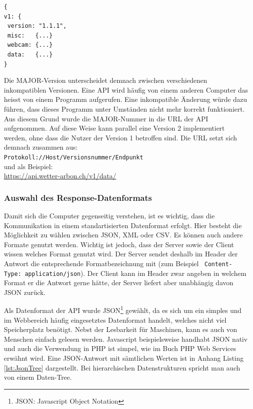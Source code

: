 \vspace{3mm}
\begin{lstlisting}[label=lst:versionierung,caption=Versionierungsangabe auf der obersten Hierarchiestufe, language=HTML5, style=php]
{
v1: {
 version: "1.1.1",
 misc:   {...}
 webcam: {...}
 data:   {...}
}
\end{lstlisting}
\vspace{3mm}

\noindent
Die MAJOR-Version unterscheidet demnach zwischen verschiedenen inkompatiblen Versionen. Eine API wird häufig von einem anderen Computer das heisst von einem Programm aufgerufen. Eine inkompatible Änderung würde dazu führen, dass dieses Programm unter Umständen nicht mehr korrekt funktioniert. Aus diesem Grund wurde die MAJOR-Nummer in die URL der API aufgenommen. Auf diese Weise kann parallel eine Version 2 implementiert werden, ohne dass die Nutzer der Version 1 betroffen sind. Die URL setzt sich demnach zusammen aus: \\

\noindent
\texttt{Protokoll://Host/Versionsnummer/Endpunkt}\\
und als Beispiel:\\
\url{https://api.wetter-arbon.ch/v1/data/}

\noindent
{}


\subsubsection{Auswahl des Response-Datenformats}
Damit sich die Computer gegenseitig verstehen, ist es wichtig, dass die Kommunikation in einem standartisierten Datenformat erfolgt. Hier besteht die Möglichkeit zu wählen zwischen JSON, XML oder CSV. Es können auch andere Formate genutzt werden. Wichtig ist jedoch, dass der Server sowie der Client wissen welches Format genutzt wird. Der Server sendet deshalb im Header der Antwort die entsprechende Formatbezeichnung mit (zum Beispiel \texttt{ Content-Type: application/json}). Der Client kann im Header zwar angeben in welchem Format er die Antwort gerne hätte, der Server liefert aber unabhängig davon JSON zurück.

Als Datenformat der API wurde JSON\footnote{JSON: Javascript Object Notation} gewählt, da es sich um ein simples und im Webbereich häufig eingesetztes Datenformat handelt, welches nicht viel Speicherplatz benötigt. Nebst der Lesbarkeit für Maschinen, kann es auch von Menschen einfach gelesen werden. Javascript beispielsweise handhabt JSON nativ und auch die Verwendung in PHP ist simpel, wie im Buch PHP Web Services \cite{LornaJaneMitchell2013oreilly} erwähnt wird. Eine JSON-Antwort mit sämtlichen Werten ist in Anhang Listing \ref{lst:JsonTree} dargestellt. Bei hierarchischen Datenstrukturen spricht man auch von einem Daten-Tree.



